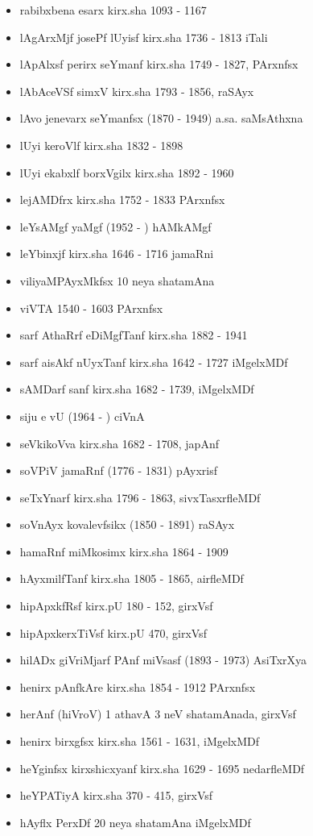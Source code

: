 {\begin{itemize}
\item rabibxbena esarx kirx.sha {\rm 1093 - 1167}
\item lAgArxMjf josePf lUyisf kirx.sha {\rm 1736 - 1813} iTali
\item lApAlxsf perirx seYmanf kirx.sha {\rm 1749 - 1827}, PArxnfsx
\item lAbAceVSf simxV kirx.sha {\rm 1793 - 1856}, raSAyx
\item lAvo jenevarx seYmanfsx {\rm (1870 - 1949)} a.sa. saMsAthxna
\item lUyi keroVlf kirx.sha {\rm 1832 - 1898}
\item lUyi ekabxlf borxVgilx kirx.sha {\rm 1892 - 1960}
\item lejAMDfrx kirx.sha {\rm 1752 - 1833} PArxnfsx
\item leYsAMgf yaMgf {\rm (1952 - )} hAMkAMgf 
\item leYbinxjf kirx.sha {\rm 1646 - 1716} jamaRni
\item viliyaMPAyxMkfsx {\rm 10} neya shatamAna
\item viVTA {\rm 1540 - 1603} PArxnfsx
\item sarf AthaRrf eDiMgfTanf kirx.sha {\rm 1882 - 1941}
\item sarf aisAkf nUyxTanf kirx.sha {\rm 1642 - 1727} iMgelxMDf
\item sAMDarf sanf kirx.sha {\rm 1682 - 1739}, iMgelxMDf
\item siju e vU {\rm (1964 - )} ciVnA
\item seVkikoVva kirx.sha {\rm 1682 - 1708}, japAnf
\item soVPiV jamaRnf {\rm (1776 - 1831)} pAyxrisf
\item seTxYnarf kirx.sha {\rm 1796 - 1863}, sivxTasxrfleMDf
\item soVnAyx kovalevfsikx {\rm (1850 - 1891)} raSAyx
\item hamaRnf miMkosimx kirx.sha {\rm 1864 - 1909}
\item hAyxmilfTanf kirx.sha {\rm 1805 - 1865}, airfleMDf
\item hipApxkfRsf kirx.pU {\rm 180 - 152}, girxVsf
\item hipApxkerxTiVsf kirx.pU {\rm 470}, girxVsf
\item hilADx giVriMjarf PAnf miVsasf {\rm (1893 - 1973)} AsiTxrXya
\item henirx pAnfkAre kirx.sha {\rm 1854 - 1912} PArxnfsx
\item herAnf (hiVroV) {\rm 1} athavA {\rm 3} neV shatamAnada, girxVsf
\item henirx birxgfsx kirx.sha {\rm 1561 - 1631}, iMgelxMDf
\item heYginfsx kirxshicxyanf kirx.sha {\rm 1629 - 1695} nedarfleMDf
\item heYPATiyA kirx.sha {\rm 370 - 415}, girxVsf
\item hAyflx PerxDf {\rm 20} neya shatamAna iMgelxMDf
\end{itemize}

}
